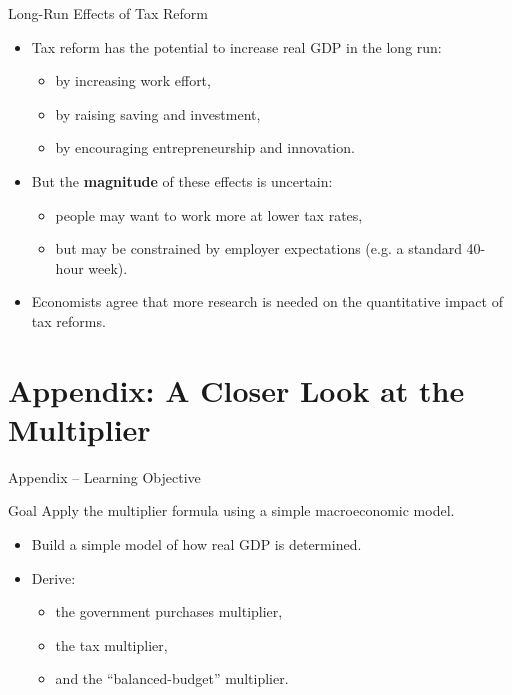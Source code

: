 \documentclass[aspectratio=169]{beamer}
\begin{document}
\begin{frame}{Long-Run Effects of Tax Reform}
\transfade
\begin{itemize}
  \item Tax reform has the potential to increase real GDP in the long run:
  \begin{itemize}
    \item by increasing work effort,
    \item by raising saving and investment,
    \item by encouraging entrepreneurship and innovation.
  \end{itemize}
  \item But the \textbf{magnitude} of these effects is uncertain:
  \begin{itemize}
    \item people may want to work more at lower tax rates,
    \item but may be constrained by employer expectations (e.g. a standard 40-hour week).
  \end{itemize}
  \item Economists agree that more research is needed on the quantitative impact of tax reforms.
\end{itemize}
\end{frame}

\section*{Appendix: A Closer Look at the Multiplier}

\begin{frame}{Appendix -- Learning Objective}
\transfade
\begin{block}{Goal}
Apply the multiplier formula using a simple macroeconomic model.
\end{block}
\begin{itemize}
  \item Build a simple model of how real GDP is determined.
  \item Derive:
  \begin{itemize}
    \item the government purchases multiplier,
    \item the tax multiplier,
    \item and the “balanced-budget” multiplier.
  \end{itemize}
\end{itemize}
\end{frame}
\end{document}
